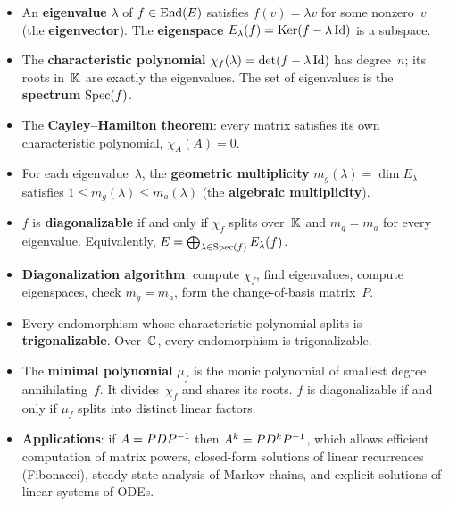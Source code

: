 \begin{itemize}
  \item An \textbf{eigenvalue} $\lambda$ of $f\in\operatorname{End}(E)$ satisfies
    $f(v) = \lambda v$ for some nonzero~$v$ (the \textbf{eigenvector}).
    The \textbf{eigenspace} $E_\lambda(f) = \operatorname{Ker}(f - \lambda\operatorname{Id})$ is a
    subspace.

  \item The \textbf{characteristic polynomial}
    $\chi_f(\lambda) = \det(f - \lambda\operatorname{Id})$ has degree~$n$; its roots
    in~${\mathbb{K}}$ are exactly the eigenvalues.  The set of eigenvalues is
    the \textbf{spectrum} $\operatorname{Spec}(f)$.

  \item The \textbf{Cayley--Hamilton theorem}: every matrix satisfies
    its own characteristic polynomial, $\chi_A(A) = 0$.

  \item For each eigenvalue~$\lambda$, the \textbf{geometric
    multiplicity} $m_g(\lambda) = \dim E_\lambda$ satisfies
    $1 \leq m_g(\lambda) \leq m_a(\lambda)$ (the \textbf{algebraic
    multiplicity}).

  \item $f$ is \textbf{diagonalizable} if and only if $\chi_f$ splits
    over~${\mathbb{K}}$ and $m_g = m_a$ for every eigenvalue.  Equivalently,
    $E = \bigoplus_{\lambda\in\operatorname{Spec}(f)} E_\lambda(f)$.

  \item \textbf{Diagonalization algorithm}: compute $\chi_f$, find
    eigenvalues, compute eigenspaces, check $m_g = m_a$, form the
    change-of-basis matrix~$P$.

  \item Every endomorphism whose characteristic polynomial splits is
    \textbf{trigonalizable}.  Over~${\mathbb{C}}$, every endomorphism is
    trigonalizable.

  \item The \textbf{minimal polynomial} $\mu_f$ is the monic
    polynomial of smallest degree annihilating~$f$.  It divides~$\chi_f$
    and shares its roots.  $f$ is diagonalizable if and only if $\mu_f$
    splits into distinct linear factors.

  \item \textbf{Applications}: if $A = PD{P}^{-1}$ then
    $A^k = PD^k{P}^{-1}$, which allows efficient computation of matrix
    powers, closed-form solutions of linear recurrences (Fibonacci),
    steady-state analysis of Markov chains, and explicit solutions of
    linear systems of ODEs.
\end{itemize}
